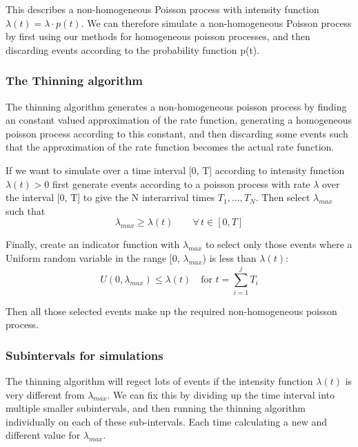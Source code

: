     This describes a non-homogeneous Poisson process with intensity function \(\lambda(t) = \lambda \cdot p(t)\). 
    We can therefore simulate a non-homogeneous Poisson process by first using our methods for homogeneous poisson processes, and then discarding events according to the probability function p(t).  \newline \newline

    \subsubsection{The Thinning algorithm}
    The thinning algorithm generates a non-homogeneous poisson process by finding an constant valued 
    approximation of the rate function, generating a homogeneous poisson process according to this 
    constant, and then discarding some events such that the approximation of the rate function 
    becomes the actual rate function.

    If we want to simulate over a time interval [0, T] according to intensity function 
    \(\lambda(t) > 0\) first generate events according to a poisson process with rate \(\lambda\)
    over the interval [0, T] to give the N interarrival times \(T_1, \dots, T_N\).\newline
    Then select \(\lambda_{max}\) such that 
    \begin{equation*}
        \lambda_{max} \ge \lambda(t) \qquad \forall \, t \in [0, T]
    \end{equation*}

    Finally, create an indicator function with \(\lambda_{max}\) to select only those events where
    a Uniform random variable in the range [0, \(\lambda_{max}\)) is less than \(\lambda(t)\): 
    \begin{equation*}
        U(0, \lambda_{max}) \le \lambda(t) \quad \text{for } t = \sum_{i=1}^{j} T_i
    \end{equation*}

    Then all those selected events make up the required non-homogeneous poisson process.
    \subsubsection{Subintervals for simulations}
    The thinning algorithm will regect lots of events if the intensity function \(\lambda(t)\) 
    is very different from \(\lambda_{max}\). We can fix this by dividing up the time interval
    into multiple smaller subintervals, and then running the thinning algorithm individually on
    each of these sub-intervals. Each time calculating a new and different value for 
    \(\lambda_{max}\).
